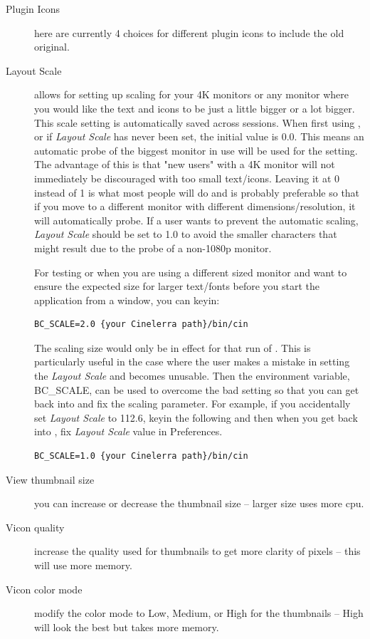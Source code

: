\begin{description}
    \item[Plugin Icons] here are currently 4 choices for different plugin icons to include the old original.
    \item[Layout Scale] allows for setting up scaling 
for your 4K monitors or any monitor where you would like the text and icons to be just a little bigger or a lot bigger. This scale setting is automatically saved across sessions. 
When first using \CGG{}, or if \textit{Layout Scale} has never been set, the initial value is 0.0.
This means an automatic probe of the biggest monitor in use will be used for the setting. The advantage of this is that "new users" with a 4K monitor will not immediately be discouraged with too small text/icons.
Leaving it at 0 instead of 1 is what most people will do and is probably preferable so that if you move to a different monitor with different dimensions/resolution, it will automatically probe. 
If a user wants to prevent the automatic scaling, \textit{Layout Scale} should be set to 1.0 to avoid the smaller characters that might result due to the probe of a non-1080p monitor.

For testing or when you are using a different sized monitor and want to ensure the expected
size for larger text/fonts before you start the application from a window, you can keyin:
\begin{lstlisting}[numbers=none]
        BC_SCALE=2.0 {your Cinelerra path}/bin/cin
\end{lstlisting}
The scaling size would only be in effect for that run of \CGG{}.  This is particularly
useful in the case where the user makes a mistake in setting the \textit{Layout Scale} and \CGG{} becomes unusable. 
Then the environment variable, BC\_SCALE, can be used to overcome the bad setting so that you can get back into
\CGG{} and fix the scaling parameter.  For example, if you 
accidentally set \textit{Layout Scale} to 112.6, keyin the following 
and then when you get back into \CGG{}, fix \textit{Layout Scale} value in Preferences.  
\begin{lstlisting}[numbers=none]
        BC_SCALE=1.0 {your Cinelerra path}/bin/cin
\end{lstlisting}

    \item[View thumbnail size] you can increase or decrease the thumbnail size -- larger size uses more cpu.
    \item[Vicon quality]  increase the quality used for thumbnails to get more clarity of pixels -- this will use
    more memory.
    \item[Vicon color mode] modify the color mode to Low, Medium, or High for the thumbnails -- High will
    look the best but takes more memory.
\end{description}

